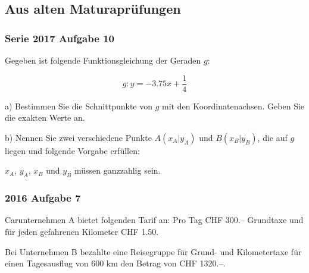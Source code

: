 \subsection{Aus alten Maturaprüfungen}

\subsubsection{Serie 2017 Aufgabe 10}

Gegeben ist folgende Funktionsgleichung der Geraden $g$:

$$g: y = -3.75x + \frac{1}{4}$$

a) Bestimmen Sie die Schnittpunkte von $g$ mit den Koordinatenachsen.
Geben Sie die exakten Werte an.

\newpage

b) Nennen Sie zwei verschiedene Punkte $A(x_A | y_A)$ und $B(x_B | y_B)$, die
auf $g$ liegen und folgende Vorgabe erfüllen:

$x_A$, $y_A$, $x_B$ und $y_B$ müssen ganzzahlig sein. 

\newpage



\subsubsection{2016 Aufgabe 7}

Carunternehmen A bietet folgenden Tarif an:
Pro Tag CHF 300.-- Grundtaxe und für jeden gefahrenen Kilometer CHF 1.50.

Bei Unternehmen B bezahlte eine Reisegruppe für Grund- und Kilometertaxe für einen
Tagesausflug von 600 km den Betrag von CHF 1320.--.

